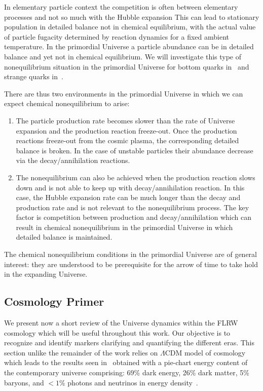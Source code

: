 In elementary particle context the competition is often between elementary processes and not so much with the Hubble expansion This can lead to stationary population in detailed balance not in chemical equilibrium, with the actual value of particle fugacity determined by reaction dynamics for a fixed ambient temperature. In the primordial Universe a particle abundance can be in detailed balance and yet not in chemical equilibrium. We will investigate this type of nonequilibrium situation in the primordial Universe for bottom quarks in~ and strange quarks in~.

There are thus two environments in the primordial Universe in which we can expect chemical nonequilibrium to arise:
\begin{enumerate}
\item The particle production rate becomes slower than the rate of Universe expansion and the production reaction freeze-out. Once the production reactions freeze-out from the cosmic plasma, the corresponding detailed balance is broken. In the case of unstable particles their abundance decrease via the decay/annihilation reactions.
%
\item The nonequilibrium can also be achieved when the production reaction slows down and is not able to keep up with decay/annihilation reaction. In this case, the Hubble expansion rate can be much longer than the decay and production rate and is not relevant to the nonequilibrium process. The key factor is competition between production and decay/annihilation which can result in chemical nonequilibrium in the primordial Universe in which detailed balance is maintained.
\end{enumerate}
The chemical nonequilibrium conditions in the primordial Universe are of general interest: they are understood to be prerequisite for the arrow of time to take hold in the expanding Universe.


\subsection{Cosmology Primer}
\label{sec:flrw}
We present now a short review of the Universe dynamics within the FLRW cosmology which will be useful throughout this work. Our objective is to recognize and identify markers clarifying and quantifying the different eras. This section unlike the remainder of the work relies on $\Lambda\mathrm{CDM}$ model of cosmology which leads to the results seen in~ obtained with a pie-chart energy content of the contemporary universe comprising: 69\% dark energy, 26\% dark matter, 5\% baryons, and $<1$\% photons and neutrinos in energy density~\cite{Davis:2003ad,Planck:2018vyg}. 

